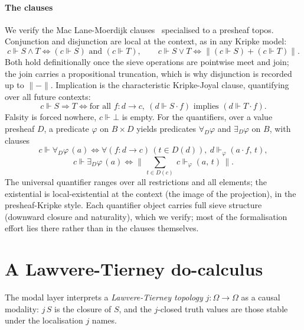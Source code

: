 \documentclass{lmcs}
\newcommand{\Om}{\Omega}
\begin{document}
\paragraph{The clauses}
We verify the Mac Lane-Moerdijk clauses~\cite[VI.6]{maclane-moerdijk-1992} specialised to a presheaf topos.
Conjunction and disjunction are local at the context, as in any Kripke model:
\[ c \Vdash S \wedge T \iff (c \Vdash S)\text{ and }(c \Vdash T), \qquad
   c \Vdash S \vee T \iff \lVert (c \Vdash S) + (c \Vdash T) \rVert. \]
Both hold definitionally once the sieve operations are pointwise meet and join; the join carries a propositional truncation, which is why disjunction is recorded up to $\lVert-\rVert$.
Implication is the characteristic Kripke-Joyal clause, quantifying over all future contexts:
\[ c \Vdash S \Rightarrow T \iff \text{for all } f : d \to c,\ (d \Vdash S{\cdot}f)\text{ implies }(d \Vdash T{\cdot}f). \]
Falsity is forced nowhere, $c \Vdash \bot$ is empty.
For the quantifiers, over a value presheaf $D$, a predicate $\varphi$ on $B \times D$ yields predicates $\forall_D\varphi$ and $\exists_D\varphi$ on $B$, with clauses
\[ c \Vdash \forall_D\varphi\,(a) \iff \forall (f : d\to c)\,(t \in D(d)),\ d \Vdash_\varphi (a{\cdot}f,\,t), \]
\[ c \Vdash \exists_D\varphi\,(a) \iff \big\lVert\, \textstyle\sum_{t\in D(c)}\ c \Vdash_\varphi (a,\,t) \,\big\rVert. \]
The universal quantifier ranges over all restrictions and all elements; the existential is local-existential at the context (the image of the projection), in the presheaf-Kripke style.
Each quantifier object carries full sieve structure (downward closure and naturality), which we verify; most of the formalisation effort lies there rather than in the clauses themselves.

\section{A Lawvere-Tierney do-calculus}\label{sec:modal}

The modal layer interprets a \emph{Lawvere-Tierney topology} $j : \Om \to \Om$ as a causal modality: $j\,S$ is the closure of $S$, and the $j$-closed truth values are those stable under the localisation $j$ names.
\end{document}
